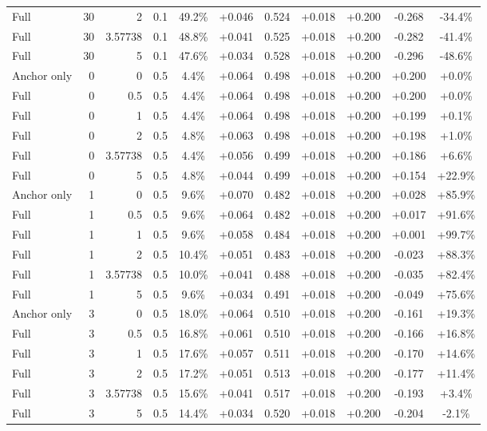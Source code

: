 \begin{table}[htbp]
\begin{tabular}{lrrrccccccc}
Full & 30 & 2 & 0.1 & 49.2\% & +0.046 & 0.524 & +0.018 & +0.200 & -0.268 & -34.4\% \\
Full & 30 & 3.57738 & 0.1 & 48.8\% & +0.041 & 0.525 & +0.018 & +0.200 & -0.282 & -41.4\% \\
Full & 30 & 5 & 0.1 & 47.6\% & +0.034 & 0.528 & +0.018 & +0.200 & -0.296 & -48.6\% \\
Anchor only & 0 & 0 & 0.5 & 4.4\% & +0.064 & 0.498 & +0.018 & +0.200 & +0.200 & +0.0\% \\
Full & 0 & 0.5 & 0.5 & 4.4\% & +0.064 & 0.498 & +0.018 & +0.200 & +0.200 & +0.0\% \\
Full & 0 & 1 & 0.5 & 4.4\% & +0.064 & 0.498 & +0.018 & +0.200 & +0.199 & +0.1\% \\
Full & 0 & 2 & 0.5 & 4.8\% & +0.063 & 0.498 & +0.018 & +0.200 & +0.198 & +1.0\% \\
Full & 0 & 3.57738 & 0.5 & 4.4\% & +0.056 & 0.499 & +0.018 & +0.200 & +0.186 & +6.6\% \\
Full & 0 & 5 & 0.5 & 4.8\% & +0.044 & 0.499 & +0.018 & +0.200 & +0.154 & +22.9\% \\
Anchor only & 1 & 0 & 0.5 & 9.6\% & +0.070 & 0.482 & +0.018 & +0.200 & +0.028 & +85.9\% \\
Full & 1 & 0.5 & 0.5 & 9.6\% & +0.064 & 0.482 & +0.018 & +0.200 & +0.017 & +91.6\% \\
Full & 1 & 1 & 0.5 & 9.6\% & +0.058 & 0.484 & +0.018 & +0.200 & +0.001 & +99.7\% \\
Full & 1 & 2 & 0.5 & 10.4\% & +0.051 & 0.483 & +0.018 & +0.200 & -0.023 & +88.3\% \\
Full & 1 & 3.57738 & 0.5 & 10.0\% & +0.041 & 0.488 & +0.018 & +0.200 & -0.035 & +82.4\% \\
Full & 1 & 5 & 0.5 & 9.6\% & +0.034 & 0.491 & +0.018 & +0.200 & -0.049 & +75.6\% \\
Anchor only & 3 & 0 & 0.5 & 18.0\% & +0.064 & 0.510 & +0.018 & +0.200 & -0.161 & +19.3\% \\
Full & 3 & 0.5 & 0.5 & 16.8\% & +0.061 & 0.510 & +0.018 & +0.200 & -0.166 & +16.8\% \\
Full & 3 & 1 & 0.5 & 17.6\% & +0.057 & 0.511 & +0.018 & +0.200 & -0.170 & +14.6\% \\
Full & 3 & 2 & 0.5 & 17.2\% & +0.051 & 0.513 & +0.018 & +0.200 & -0.177 & +11.4\% \\
Full & 3 & 3.57738 & 0.5 & 15.6\% & +0.041 & 0.517 & +0.018 & +0.200 & -0.193 & +3.4\% \\
Full & 3 & 5 & 0.5 & 14.4\% & +0.034 & 0.520 & +0.018 & +0.200 & -0.204 & -2.1\% \\

\end{tabular}
\end{table}
